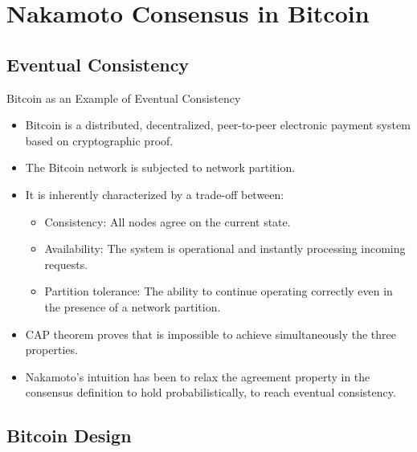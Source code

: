 \documentclass[usenames,dvipsnames]{beamer}
\begin{document}
    \section{Nakamoto Consensus in Bitcoin}
    \subsection{Eventual Consistency}
    
    \begin{frame}{Bitcoin as an Example of Eventual Consistency}
        \begin{itemize}
            \item \alert{Bitcoin} is a distributed, decentralized, peer-to-peer electronic payment system based on \alert{cryptographic proof}.
            \item The Bitcoin network is subjected to \alert{network partition}.
            \item It is inherently characterized by a trade-off between:
                \begin{itemize}
                    \item \alert{Consistency}: All nodes agree on the current state.
                    \item \alert{Availability}: The system is operational and instantly processing incoming requests.
                    \item \alert{Partition tolerance}: The ability to continue operating correctly even in the presence of a network partition.
                \end{itemize}
            \item CAP theorem proves that is \alert{impossible} to achieve \alert{simultaneously} the three properties.
            \item Nakamoto's intuition has been to relax the \alert{agreement} property in the consensus definition to hold \alert{probabilistically}, to reach \alert{eventual consistency}.
        \end{itemize}
    \end{frame}
    
    \subsection{Bitcoin Design}
    
\end{document}
